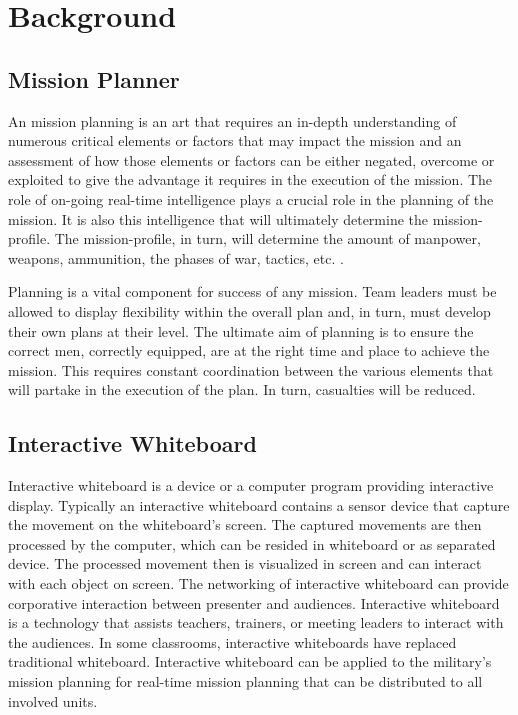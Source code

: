 \documentclass[conference]{IEEEtran}
\begin{document}
\section{Background}

\subsection{Mission Planner}
An mission planning is an art that requires an in-depth understanding of numerous critical elements or factors that may impact the mission and an assessment of how those elements or factors can be either negated, overcome or exploited to give the advantage it requires in the execution of the mission. 
The role of on-going real-time intelligence plays a crucial role in the planning of the mission. 
It is also this intelligence that will ultimately determine the mission-profile. 
The mission-profile, in turn, will determine the amount of manpower, weapons, ammunition, the phases of war, tactics, etc. \cite{AB}.

Planning is a vital component for success of any mission. Team leaders must be allowed to display flexibility within the overall plan and, in turn, must develop their own plans at their level. 
The ultimate aim of planning is to ensure the correct men, correctly equipped, are at the right time and place to achieve the mission. 
This requires constant coordination between the various elements that will partake in the execution of the plan. In turn, casualties will be reduced. 

\subsection{Interactive Whiteboard}
Interactive whiteboard is a device or a computer program providing interactive display. Typically an interactive whiteboard contains a sensor device that capture the movement on the whiteboard’s screen. The captured movements are then processed by the computer, which can be resided in whiteboard or as separated device. The processed movement then is visualized in screen and can interact with each object on screen. The networking of interactive whiteboard can provide corporative interaction between presenter and audiences. Interactive whiteboard is a technology that assists teachers, trainers, or meeting leaders to interact with the audiences. In some classrooms, interactive whiteboards have replaced traditional whiteboard. Interactive whiteboard can be applied to the military's mission planning for real-time mission planning that can be distributed to all involved units.
\end{document}
